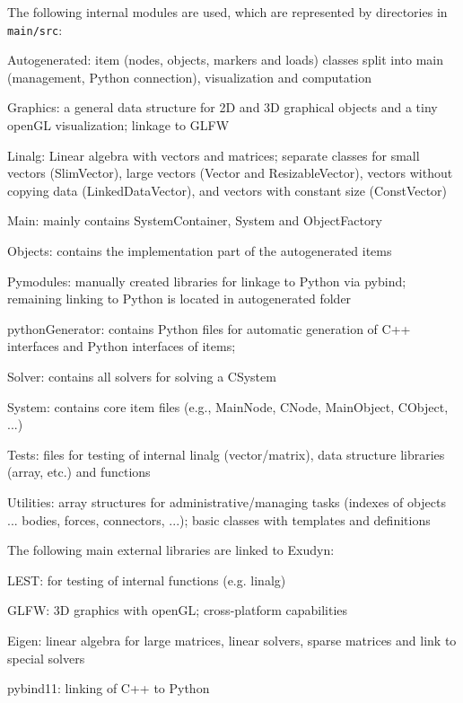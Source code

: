 The following internal modules are used, which are represented by directories in \texttt{main/src}:
\bi
  \item Autogenerated: item (nodes, objects, markers and loads) classes split into main (management, Python connection), visualization and computation
  \item Graphics: a general data structure for 2D and 3D graphical objects and a tiny openGL visualization; linkage to GLFW
    \item Linalg: Linear algebra with vectors and matrices; separate classes for small vectors (SlimVector), large vectors (Vector and ResizableVector), vectors without copying data (LinkedDataVector), and vectors with constant size (ConstVector)
  \item Main: mainly contains SystemContainer, System and ObjectFactory
  \item Objects: contains the implementation part of the autogenerated items
  \item Pymodules: manually created libraries for linkage to Python via pybind; remaining linking to Python is located in autogenerated folder
  \item pythonGenerator: contains Python files for automatic generation of C++ interfaces and Python interfaces of items;
  \item Solver: contains all solvers for solving a CSystem
  \item System: contains core item files (e.g., MainNode, CNode, MainObject, CObject, ...)
  \item Tests: files for testing of internal linalg (vector/matrix), data structure libraries (array, etc.) and functions
    \item Utilities: array structures for administrative/managing tasks (indexes of objects ... bodies, forces, connectors, ...); basic classes with templates and definitions
\ei

The following main external libraries are linked to Exudyn:
\bi
  \item LEST: for testing of internal functions (e.g. linalg)
  \item GLFW: 3D graphics with openGL; cross-platform capabilities
  \item Eigen: linear algebra for large matrices, linear solvers, sparse matrices and link to special solvers
  \item pybind11: linking of C++ to Python
\ei

